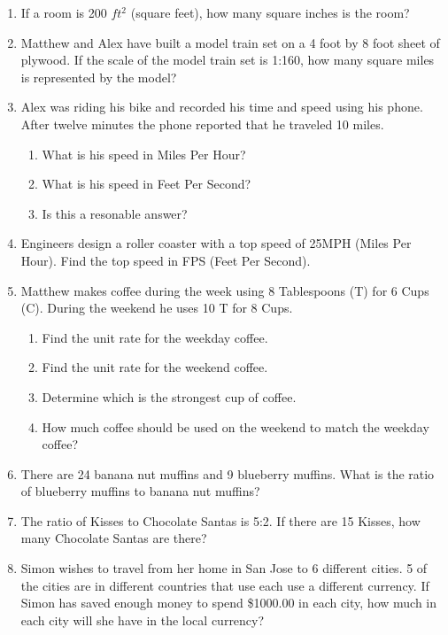 \documentclass[12pt]{article}
\begin{document}
\begin{enumerate}

\item If a room is 200 \(ft^{2}\) (square feet), how many square inches is the room?

\item Matthew and Alex have built a model train set on a 4 foot by 8 foot sheet of plywood.  If the scale of the model train set is 1:160, how many square miles is represented by the model?

\item Alex was riding his bike and recorded his time and speed using his phone.  After twelve minutes the phone reported that he traveled 10 miles.
	\begin{enumerate}
		\item What is his speed in Miles Per Hour?
		\item What is his speed in Feet Per Second?
		\item Is this a resonable answer?
	\end{enumerate}

\item Engineers design a roller coaster with a top speed of 25MPH (Miles Per Hour).  Find the top speed in FPS (Feet Per Second).

\item Matthew makes coffee during the week using 8 Tablespoons (T) for 6 Cups (C).  During the weekend he uses 10 T for 8 Cups.
	\begin{enumerate}
		\item Find the unit rate for the weekday coffee.
		\item Find the unit rate for the weekend coffee.
		\item Determine which is the strongest cup of coffee.
		\item How much coffee should be used on the weekend to match the weekday coffee?
	\end{enumerate}

\item There are 24 banana nut muffins and 9 blueberry muffins.  What is the ratio of blueberry muffins to banana nut muffins?

\item The ratio of Kisses to Chocolate Santas is 5:2.  If there are 15 Kisses, how many Chocolate Santas are there?

\item Simon wishes to travel from her home in San Jose to 6 different cities.  5 of the cities are in different countries that use each use a different currency.  If Simon has saved enough money to spend \$1000.00 in each city, how much in each city will she have in the local currency?


\end{enumerate}
\end{document}
